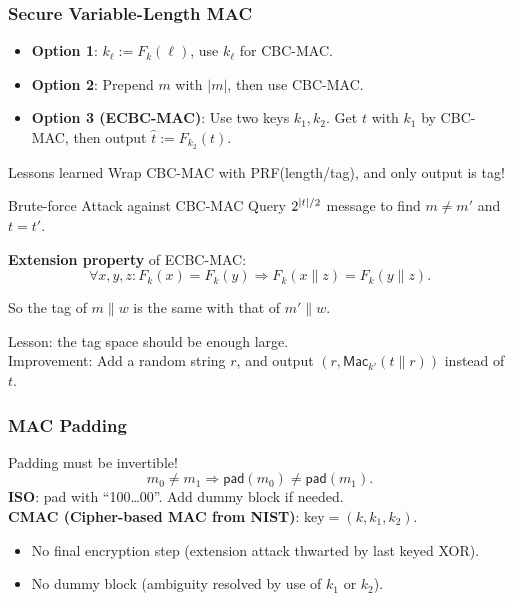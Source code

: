\begin{frame}\frametitle{Secure Variable-Length MAC}
\begin{itemize}
\item \textbf{Option 1}: $k_{\ell} := F_k(\ell)$, use $k_{\ell}$ for CBC-MAC.
\item \textbf{Option 2}: Prepend $m$ with $|m|$, then use CBC-MAC.
\begin{figure}
\begin{center}

\end{center}
\end{figure}
\item \textbf{Option 3 (ECBC-MAC)}: Use two keys $k_1, k_2$. Get $t$ with $k_1$ by CBC-MAC, then output $\hat{t} := F_{k_2}(t)$.
\end{itemize}
\begin{alertblock}{Lessons learned}
Wrap CBC-MAC with PRF(length/tag), and only output is tag!
\end{alertblock}
\end{frame}
\begin{frame}{Brute-force Attack against CBC-MAC}
Query $2^{\lvert t\rvert/2}$ message to find $m \neq m'$ and $t = t'$.
\newline

\textbf{Extension property} of ECBC-MAC:
\[ \forall x,y,z: F_k(x)=F_k(y) \Rightarrow F_k(x\|z)=F_k(y\|z).   \]

So the tag of $m\|w$ is the same with that of $m'\|w$.
\newline

Lesson: the tag space should be enough large.\\
Improvement: Add a random string $r$, and output $(r, \mathsf{Mac}_{k'}(t\|r))$ instead of $t$.
\end{frame}
\begin{frame}\frametitle{MAC Padding}
Padding must be invertible!\[ m_0\neq m_1 \Rightarrow \mathsf{pad}(m_0) \neq \mathsf{pad}(m_1). \]
\textbf{ISO}: pad with ``100\dots00''. Add dummy block if needed.\\
\textbf{CMAC (Cipher-based MAC from NIST)}: key$=(k,k_1,k_2)$.
\begin{figure}
\begin{center}

\end{center}
\end{figure}
\begin{itemize}
\item No final encryption step (extension attack thwarted by last keyed XOR).
\item No dummy block (ambiguity resolved by use of $k_1$ or $k_2$).
\end{itemize}
\end{frame}
